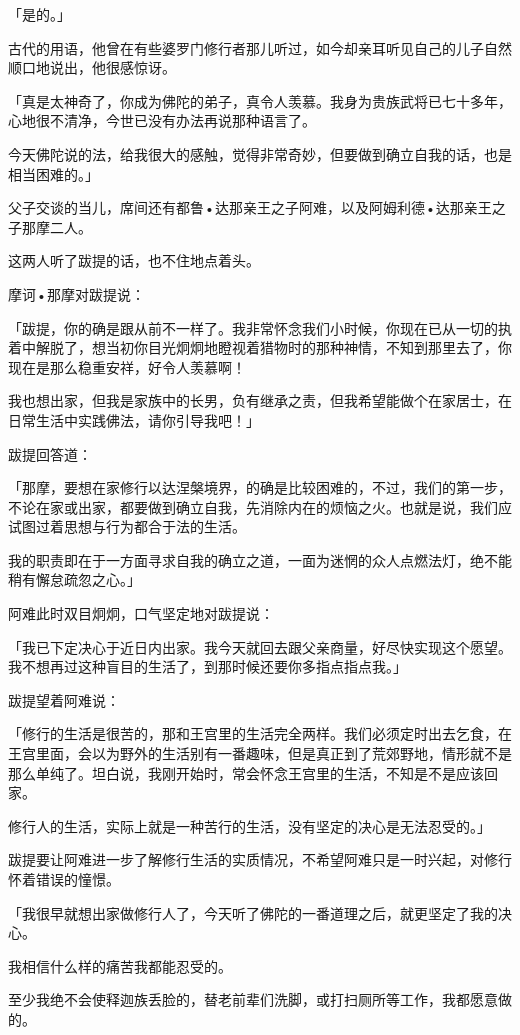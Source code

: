 \documentclass[twoside,openany]{book}
\begin{document}
「是的。」

古代的用语，他曾在有些婆罗门修行者那儿听过，如今却亲耳听见自己的儿子自然顺口地说出，他很感惊讶。

「真是太神奇了，你成为佛陀的弟子，真令人羡慕。我身为贵族武将已七十多年，心地很不清净，今世已没有办法再说那种语言了。

今天佛陀说的法，给我很大的感触，觉得非常奇妙，但要做到确立自我的话，也是相当困难的。」

父子交谈的当儿，席间还有都鲁•达那亲王之子阿难，以及阿姆利德•达那亲王之子那摩二人。

这两人听了跋提的话，也不住地点着头。

摩诃•那摩对跋提说：

「跋提，你的确是跟从前不一样了。我非常怀念我们小时候，你现在已从一切的执着中解脱了，想当初你目光炯炯地瞪视着猎物时的那种神情，不知到那里去了，你现在是那么稳重安祥，好令人羡慕啊！

我也想出家，但我是家族中的长男，负有继承之责，但我希望能做个在家居士，在日常生活中实践佛法，请你引导我吧！」

跋提回答道：

「那摩，要想在家修行以达涅槃境界，的确是比较困难的，不过，我们的第一步，不论在家或出家，都要做到确立自我，先消除内在的烦恼之火。也就是说，我们应试图过着思想与行为都合于法的生活。

我的职责即在于一方面寻求自我的确立之道，一面为迷惘的众人点燃法灯，绝不能稍有懈怠疏忽之心。」

阿难此时双目炯炯，口气坚定地对跋提说：

「我已下定决心于近日内出家。我今天就回去跟父亲商量，好尽快实现这个愿望。我不想再过这种盲目的生活了，到那时候还要你多指点指点我。」

跋提望着阿难说：

「修行的生活是很苦的，那和王宫里的生活完全两样。我们必须定时出去乞食，在王宫里面，会以为野外的生活别有一番趣味，但是真正到了荒郊野地，情形就不是那么单纯了。坦白说，我刚开始时，常会怀念王宫里的生活，不知是不是应该回家。

修行人的生活，实际上就是一种苦行的生活，没有坚定的决心是无法忍受的。」

跋提要让阿难进一步了解修行生活的实质情况，不希望阿难只是一时兴起，对修行怀着错误的憧憬。

「我很早就想出家做修行人了，今天听了佛陀的一番道理之后，就更坚定了我的决心。

我相信什么样的痛苦我都能忍受的。

至少我绝不会使释迦族丢脸的，替老前辈们洗脚，或打扫厕所等工作，我都愿意做的。
\end{document}
